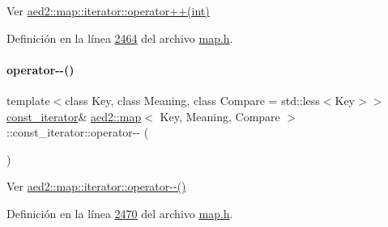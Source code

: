 Ver \hyperlink{classaed2_1_1map_1_1iterator_af4fe5565eb478cfccd254b2ef230b974_af4fe5565eb478cfccd254b2ef230b974}{aed2\+::map\+::iterator\+::operator++(int)} 



Definición en la línea \hyperlink{map_8h_source_l02464}{2464} del archivo \hyperlink{map_8h_source}{map.\+h}.

\mbox{\label{classaed2_1_1map_1_1const__iterator_ae12d6608eeca05957fa3de3f50287c90_ae12d6608eeca05957fa3de3f50287c90}} 
\paragraph{\texorpdfstring{operator-\/-\/()}{operator--()}\hspace{0.1cm}{\footnotesize\ttfamily [1/2]}}
{\footnotesize\ttfamily template$<$class Key, class Meaning, class Compare = std\+::less$<$\+Key$>$$>$ \\
\hyperlink{classaed2_1_1map_1_1const__iterator}{const\+\_\+iterator}\& \hyperlink{classaed2_1_1map}{aed2\+::map}$<$ Key, Meaning, Compare $>$\+::const\+\_\+iterator\+::operator-\/-\/ (\begin{DoxyParamCaption}{ }\end{DoxyParamCaption})\hspace{0.3cm}{\ttfamily [inline]}}



Ver \hyperlink{classaed2_1_1map_1_1iterator_ae7f70f71545d2a9de17b65edaaec748a_ae7f70f71545d2a9de17b65edaaec748a}{aed2\+::map\+::iterator\+::operator-\/-\/()} 



Definición en la línea \hyperlink{map_8h_source_l02470}{2470} del archivo \hyperlink{map_8h_source}{map.\+h}.

\mbox{\label{classaed2_1_1map_1_1const__iterator_ad5ae1cb1d000ac1f528ff32f9af3e228_ad5ae1cb1d000ac1f528ff32f9af3e228}} 
